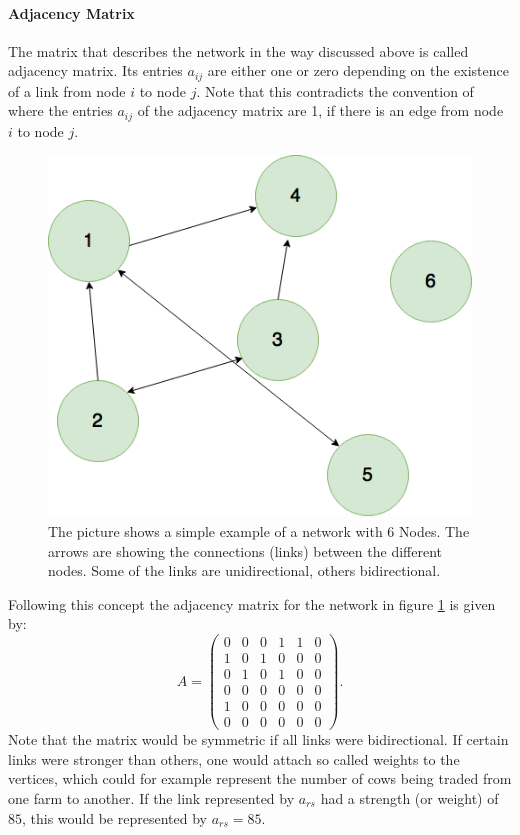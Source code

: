 \paragraph{Adjacency Matrix}
The matrix that describes the network in the way discussed above is called adjacency matrix. Its entries $a_{ij}$ are either one or zero depending on the existence of a link from node $i$ to node $j$. Note that this contradicts the convention of \citep{BAR16} where the entries $a_{ij}$ of the adjacency matrix are 1, if there is an edge from node $i$ to node $j$.
\begin{figure}[htbp]
\centering
\noindent\includegraphics[width=0.4\linewidth,height=\textheight,
keepaspectratio]{Graph.png} 
\caption[Graph Example]{The picture shows  a simple example of a network with 6 Nodes. The arrows are showing the connections (links) between the different nodes. Some of the links are unidirectional, others bidirectional.}
\label{fig:simpleNetwork}
\end{figure}
Following this concept the adjacency matrix for the network in figure \ref{fig:simpleNetwork} is given by:
\begin{equation}
A = \left( \begin{matrix}
 0 & 0 & 0 & 1 & 1 & 0\\
 1 & 0 & 1 & 0 & 0 & 0\\
 0 & 1 & 0 & 1 & 0 & 0\\
 0 & 0 & 0 & 0 & 0 & 0\\
 1 & 0 & 0 & 0 & 0 & 0\\
 0 & 0 & 0 & 0 & 0 & 0
 \end{matrix}
 \right). \label{eq:adjMatExamp}
\end{equation}
Note that the matrix would be symmetric if all links were bidirectional. 
If certain links were stronger than others, one would attach so called weights to the vertices, which could for example represent the number of cows being traded from one farm to another. If the link represented by $a_{rs}$ had a strength (or weight) of $85$, this would be represented by $a_{rs}= 85$. 
